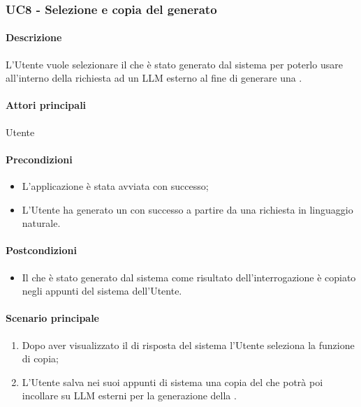 \subsubsection{UC8 - Selezione e copia del  generato}\label{UC8}

\paragraph*{Descrizione}
L’Utente vuole selezionare il  che è stato generato dal sistema per poterlo usare all’interno della richiesta ad un LLM esterno al fine di generare una .

\paragraph*{Attori principali}
Utente

\paragraph*{Precondizioni}
\begin{itemize}
  \item L'applicazione è stata avviata con successo;
  \item L’Utente ha generato un  con successo a partire da una richiesta in linguaggio naturale.  
\end{itemize}

\paragraph*{Postcondizioni}
\begin{itemize}
  \item Il  che è stato generato dal sistema come risultato dell’interrogazione è copiato negli appunti del sistema dell’Utente.
\end{itemize}

\paragraph*{Scenario principale}
\begin{enumerate}
  \item Dopo aver visualizzato il  di risposta del sistema l’Utente seleziona la funzione di copia;
  \item L’Utente salva nei suoi appunti di sistema una copia del  che potrà poi incollare su LLM esterni per la generazione della .
\end{enumerate}